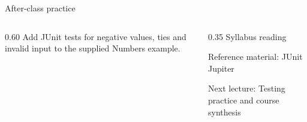 \documentclass[10pt,aspectratio=169]{beamer}
\begin{document}
\begin{frame}[fragile,t]{After-class practice}
\begin{columns}[T,onlytextwidth]\begin{column}{0.60\textwidth}
Add JUnit tests for negative values, ties and invalid input to the supplied Numbers example.
\end{column}\begin{column}{0.35\textwidth}\small
Syllabus reading\par Reference material: JUnit Jupiter

Next lecture: Testing practice and course synthesis
\end{column}\end{columns}
\end{frame}
\end{document}

